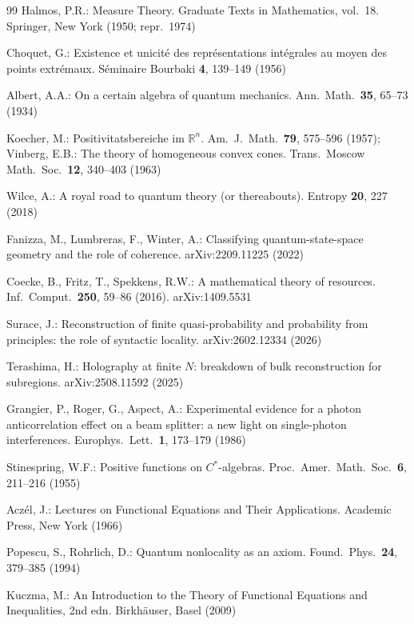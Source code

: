 \documentclass[11pt]{article}
\theoremstyle{remark}
\begin{document}
\begin{thebibliography}{99}
 Halmos, P.R.: Measure Theory. Graduate Texts in Mathematics, vol.\ 18. Springer, New York (1950; repr.\ 1974)

 Choquet, G.: Existence et unicit\'{e} des repr\'{e}sentations int\'{e}grales au moyen des points extr\'{e}maux. S\'{e}minaire Bourbaki \textbf{4}, 139--149 (1956)

 Albert, A.A.: On a certain algebra of quantum mechanics. Ann.\ Math.\ \textbf{35}, 65--73 (1934)

 Koecher, M.: Positivitatsbereiche im $\mathbb{R}^n$. Am.\ J.\ Math.\ \textbf{79}, 575--596 (1957); Vinberg, E.B.: The theory of homogeneous convex cones. Trans.\ Moscow Math.\ Soc.\ \textbf{12}, 340--403 (1963)

 Wilce, A.: A royal road to quantum theory (or thereabouts). Entropy \textbf{20}, 227 (2018)

 Fanizza, M., Lumbreras, F., Winter, A.: Classifying quantum-state-space geometry and the role of coherence. arXiv:2209.11225 (2022)

 Coecke, B., Fritz, T., Spekkens, R.W.: A mathematical theory of resources. Inf.\ Comput.\ \textbf{250}, 59--86 (2016). arXiv:1409.5531

 Surace, J.: Reconstruction of finite quasi-probability and probability from principles: the role of syntactic locality. arXiv:2602.12334 (2026)

 Terashima, H.: Holography at finite $N$: breakdown of bulk reconstruction for subregions. arXiv:2508.11592 (2025)

 Grangier, P., Roger, G., Aspect, A.: Experimental evidence for a photon anticorrelation effect on a beam splitter: a new light on single-photon interferences. Europhys.\ Lett.\ \textbf{1}, 173--179 (1986)

 Stinespring, W.F.: Positive functions on $C^*$-algebras. Proc.\ Amer.\ Math.\ Soc.\ \textbf{6}, 211--216 (1955)

 Acz\'el, J.: Lectures on Functional Equations and Their Applications. Academic Press, New York (1966)

 Popescu, S., Rohrlich, D.: Quantum nonlocality as an axiom. Found.\ Phys.\ \textbf{24}, 379--385 (1994)

 Kuczma, M.: An Introduction to the Theory of Functional Equations and Inequalities, 2nd edn. Birkh\"auser, Basel (2009)


\end{thebibliography}
\end{document}
